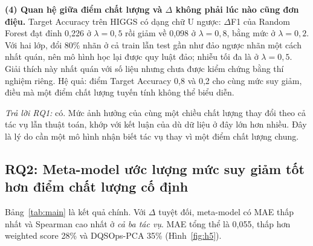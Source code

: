 \textbf{(4) Quan hệ giữa điểm chất lượng và $\Delta$ không phải lúc nào cũng đơn điệu.} Target Accuracy trên HIGGS có dạng chữ U ngược: $\Delta$F1 của Random Forest đạt đỉnh 0,226 ở $\lambda = 0{,}5$ rồi giảm về 0,098 ở $\lambda = 0{,}8$, bằng mức ở $\lambda = 0{,}2$. Với hai lớp, đổi 80\% nhãn ở cả train lẫn test gần như đảo ngược nhãn một cách nhất quán, nên mô hình học lại được quy luật đảo; nhiễu tối đa là ở $\lambda = 0{,}5$. Giải thích này nhất quán với số liệu nhưng chưa được kiểm chứng bằng thí nghiệm riêng. Hệ quả: điểm Target Accuracy 0,8 và 0,2 cho cùng mức suy giảm, điều mà một điểm chất lượng tuyến tính không thể biểu diễn.

\emph{Trả lời RQ1:} có. Mức ảnh hưởng của cùng một chiều chất lượng thay đổi theo cả tác vụ lẫn thuật toán, khớp với kết luận của \bbMohRef{} dù dữ liệu ở đây lớn hơn nhiều. Đây là lý do cần một mô hình nhận biết tác vụ thay vì một điểm chất lượng chung.

\subsection{RQ2: Meta-model ước lượng mức suy giảm tốt hơn điểm chất lượng cố định}
\label{sec:rq2}

Bảng~\ref{tab:main} là kết quả chính. Với $\Delta$ tuyệt đối, meta-model có MAE thấp nhất và Spearman cao nhất ở \emph{cả ba tác vụ}. MAE tổng thể là 0,055, thấp hơn weighted score 28\% và DQSOps-PCA 35\% (Hình~\ref{fig:h5}).

